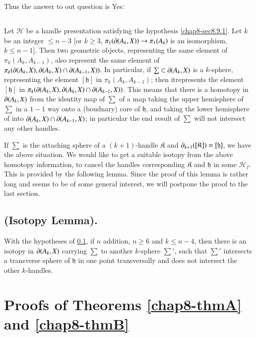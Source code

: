 Thus the answer to out question is Yes:

\setcounter{subsection}{3}
\subsection{}\label{chap8-sec8.9.4}
Let $\mathscr{H}$ be a handle presentation satisfying the hypothesis \ref{chap8-sec8.9.1}. Let $k$ be an integer $\leq n-3$ [or $k\geq 3$, $\pi_{1}(\partial(A_{k},X))\to \pi_{1}(A_{k})$ is an isomorphism, $k\leq n-1$]. Then two geometric objects, representing the same element of $\pi_{k}(A_{k},A_{k-1})$, also represent the same element of $\pi_{k}(\partial(A_{k},X), \partial(A_{k},X)\cap \partial(A_{k-1},X))$. In particular, if $\sum\subset \partial(A_{k},X)$ is a $k$-sphere, representing the element $[\mathfrak{h}]$ in $\pi_{k}(A_{k},A_{k-1})$; then it\pageoriginale represents the element $[\mathfrak{h}]$ in $\pi_{k}(\partial(A_{k},X),\partial(A_{k},X)\cap \partial(A_{k-1},X))$. This means that there is a homotopy in $\partial(A_{k},X)$ from the identity map of $\sum$ of a map taking the upper hemisphere of $\sum$ in a $1-1$ way onto a (boudnary) core of $\mathfrak{h}$, and taking the lower hemisphere of into $\partial(A_{k},X)\cap \partial(A_{k-1},X)$; in particular the end result of $\sum$ will not intersect any other handles.

If $\sum$ is the attaching sphere of a $(k+1)$-handle $\mathfrak{K}$ and $\partial_{k+1}([\mathfrak{K}])=[\mathfrak{h}]$, we have the above situation. We would like to get a suitable isotopy from the above homotopy information, to cancel the handles corresponding $\mathfrak{K}$ and $\mathfrak{h}$ in some $\mathscr{H}_{f}$. This is provided by the following lemma. Since the proof of this lemma is rather long and seems to be of some general interest, we will postpone the proof to the last section.

\subsection{(Isotopy Lemma).}\label{chap8-sec8.9.5}
With the hypotheses of \ref{chap8-sec8.9.4}, if $n$ addition, $n\geq 6$ and $k\leq n-4$, then there is an isotopy in $\partial(A_{k},X)$ carrying $\sum$ to another $k$-sphere $\sum'$, such that $\sum'$ intersects a transverse sphere of $\mathfrak{h}$ in one point transversally and does not intersect the other $k$-handles.

\section{Proofs of Theorems \ref{chap8-thmA} and \ref{chap8-thmB}}\label{chap8-sec8.10}

